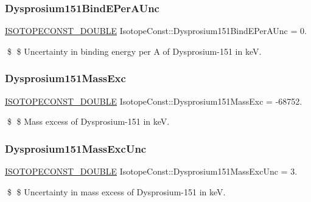 \subsubsection{\texorpdfstring{Dysprosium151\+Bind\+E\+Per\+A\+Unc}{Dysprosium151BindEPerAUnc}}
{\footnotesize\ttfamily \mbox{\hyperlink{group___isotope_const-_macros_ga8f45a7272ce02c0b4c65c44636ed719a}{I\+S\+O\+T\+O\+P\+E\+C\+O\+N\+S\+T\+\_\+\+D\+O\+U\+B\+LE}} Isotope\+Const\+::\+Dysprosium151\+Bind\+E\+Per\+A\+Unc = 0.}

\$ \$ Uncertainty in binding energy per A of Dysprosium-\/151 in keV. \mbox{\label{group___isotope_const-_dysprosium-_dy151_gaf1e6bf4a09f4290bf453a00866c53dd5}} 
\subsubsection{\texorpdfstring{Dysprosium151\+Mass\+Exc}{Dysprosium151MassExc}}
{\footnotesize\ttfamily \mbox{\hyperlink{group___isotope_const-_macros_ga8f45a7272ce02c0b4c65c44636ed719a}{I\+S\+O\+T\+O\+P\+E\+C\+O\+N\+S\+T\+\_\+\+D\+O\+U\+B\+LE}} Isotope\+Const\+::\+Dysprosium151\+Mass\+Exc = -\/68752.}

\$ \$ Mass excess of Dysprosium-\/151 in keV. \mbox{\label{group___isotope_const-_dysprosium-_dy151_gaf4648653411166102cd8d9edd9232f60}} 
\subsubsection{\texorpdfstring{Dysprosium151\+Mass\+Exc\+Unc}{Dysprosium151MassExcUnc}}
{\footnotesize\ttfamily \mbox{\hyperlink{group___isotope_const-_macros_ga8f45a7272ce02c0b4c65c44636ed719a}{I\+S\+O\+T\+O\+P\+E\+C\+O\+N\+S\+T\+\_\+\+D\+O\+U\+B\+LE}} Isotope\+Const\+::\+Dysprosium151\+Mass\+Exc\+Unc = 3.}

\$ \$ Uncertainty in mass excess of Dysprosium-\/151 in keV. \mbox{\label{group___isotope_const-_dysprosium-_dy151_ga1619e9c77cab8ad502709ca913169d34}} 
